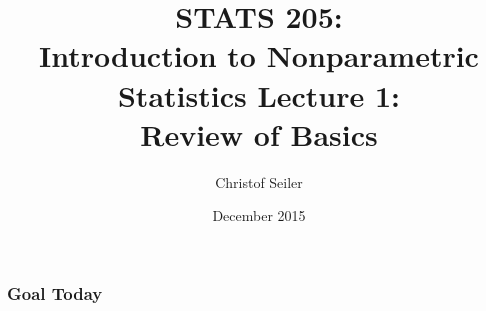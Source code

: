 \documentclass[10pt]{beamer}
\title{\large \bfseries STATS 205: \\ Introduction to Nonparametric Statistics \linebreak \linebreak \linebreak
Lecture 1: \\ Review of Basics}
\author{Christof Seiler}
\date{December 2015}
\begin{document}
\frame{
\thispagestyle{empty}
\titlepage
}

\begin{frame}
\frametitle{Goal Today}

\end{frame}
\end{document}

